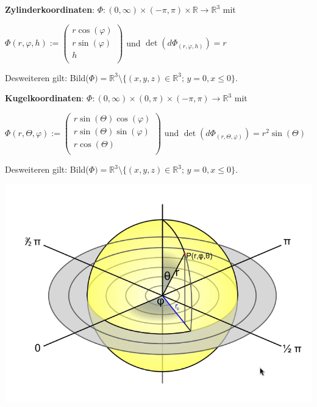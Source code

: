 \documentclass[a4paper, fontsize = 8pt, landscape]{scrartcl}
\newcommand{\R}[0]{\mathbb{R}}
\begin{document}
\begin{multicols*}{3}
    \textbf{Zylinderkoordinaten}: $\Phi: (0, \infty) \times (-\pi,\pi) \times \R \to \R^3$ mit

    \begin{center}
        $\Phi(r, \varphi, h) := \begin{pmatrix}
                r \cos(\varphi) \\ r \sin(\varphi) \\ h \\
            \end{pmatrix}$ \quad und \quad $\det(d\Phi_{(r, \varphi,h)}) = r$
    \end{center}

    Desweiteren gilt: Bild($\Phi) = \R^3 \setminus \{(x,y,z) \in \R^3; \, y = 0, x \leq 0\}$. \medskip

    \textbf{Kugelkoordinaten}: $\Phi: (0, \infty) \times (0,\pi) \times (-\pi,\pi) \to \R^3$ mit

    \begin{center}
        $\Phi(r, \Theta, \varphi) := \begin{pmatrix}
                r \sin(\Theta) \cos(\varphi) \\ r \sin(\Theta) \sin(\varphi) \\ r \cos(\Theta) \\
            \end{pmatrix}$ \quad und \quad $\det(d\Phi_{(r, \Theta, \varphi)}) = r^2 \sin(\Theta)$
    \end{center}

    \begin{center}
        \begin{minipage}{0.5\linewidth}
            \begin{center}
                Desweiteren gilt: Bild($\Phi) = \R^3 \setminus \{(x,y,z) \in \R^3; \, y = 0, x \leq 0\}$.
            \end{center}
        \end{minipage}
        \begin{minipage}{0.49\linewidth}
            \begin{center}
                \includegraphics[width=1\linewidth]{Bilder/Kugelkoordinaten.png}
            \end{center}
        \end{minipage}
    \end{center}

\end{multicols*}
\end{document}
